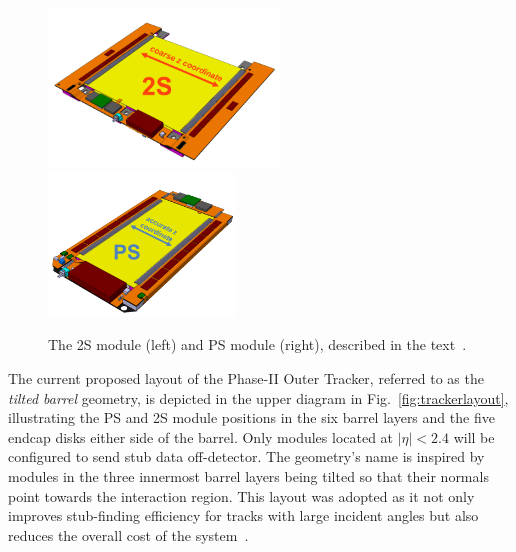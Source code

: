 \begin{figure}[tp]
\centering
\includegraphics[width=0.55\textwidth,trim={0truecm 0truecm 0truecm 1truecm},clip]{figs/tk-upgrade/2S_assembled.png}
\hfill
\includegraphics[width=0.44\textwidth,trim={0truecm 0truecm 0truecm 1truecm},clip]{figs/tk-upgrade/PS_assembled.png}
\caption{The 2S module (left) and PS module (right), described in the text~\cite{P2TrackerTDR}.}
\label{fig:2Spsmodules}
\end{figure}

The current proposed layout of the Phase-II Outer Tracker, referred to as the \emph{tilted barrel} geometry, is depicted in the upper diagram in Fig.~\ref{fig:trackerlayout}, illustrating the PS and 2S module positions in the six barrel layers and the five endcap disks either side of the barrel.
Only modules located at $|\eta| < 2.4$ will be configured to send stub data off-detector.
The geometry's name is inspired by modules in the three innermost barrel layers being tilted so that their normals point towards the interaction region.
This layout was adopted as it not only improves stub-finding efficiency for tracks with large incident angles but also reduces the overall cost of the system~\cite{P2TrackerTDR}.

